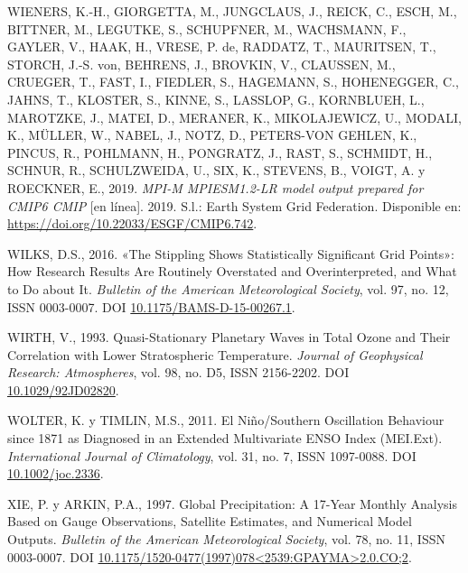 \documentclass[12pt,oneside,a4paper]{reedthesis}
\newlength{\cslhangindent}
\newenvironment{CSLReferences}[2] %
 {%
  \setlength{\parindent}{0pt}
  \ifodd #1 \everypar{\setlength{\hangindent}{\cslhangindent}}\ignorespaces\fi
  \ifnum #2 > 0
  \setlength{\parskip}{#2\baselineskip}
  \fi
 }%
 {}
\begin{document}
\begin{CSLReferences}{1}{0}
\leavevmode{}%
WIENERS, K.-H., GIORGETTA, M., JUNGCLAUS, J., REICK, C., ESCH, M., BITTNER, M., LEGUTKE, S., SCHUPFNER, M., WACHSMANN, F., GAYLER, V., HAAK, H., VRESE, P. de, RADDATZ, T., MAURITSEN, T., STORCH, J.-S. von, BEHRENS, J., BROVKIN, V., CLAUSSEN, M., CRUEGER, T., FAST, I., FIEDLER, S., HAGEMANN, S., HOHENEGGER, C., JAHNS, T., KLOSTER, S., KINNE, S., LASSLOP, G., KORNBLUEH, L., MAROTZKE, J., MATEI, D., MERANER, K., MIKOLAJEWICZ, U., MODALI, K., MÜLLER, W., NABEL, J., NOTZ, D., PETERS-VON GEHLEN, K., PINCUS, R., POHLMANN, H., PONGRATZ, J., RAST, S., SCHMIDT, H., SCHNUR, R., SCHULZWEIDA, U., SIX, K., STEVENS, B., VOIGT, A. y ROECKNER, E., 2019. \emph{MPI-M MPIESM1.2-LR model output prepared for CMIP6 CMIP} {[}en línea{]}. 2019. S.l.: Earth System Grid Federation. Disponible en: \url{https://doi.org/10.22033/ESGF/CMIP6.742}.

\leavevmode{}%
WILKS, D.S., 2016. {«{The Stippling Shows Statistically Significant Grid Points}»}: {How Research Results} Are {Routinely Overstated} and {Overinterpreted}, and {What} to {Do} about {It}. \emph{Bulletin of the American Meteorological Society}, vol. 97, no. 12, ISSN 0003-0007. DOI \href{https://doi.org/10.1175/BAMS-D-15-00267.1}{10.1175/BAMS-D-15-00267.1}.

\leavevmode{}%
WIRTH, V., 1993. Quasi-Stationary Planetary Waves in Total Ozone and Their Correlation with Lower Stratospheric Temperature. \emph{Journal of Geophysical Research: Atmospheres}, vol. 98, no. D5, ISSN 2156-2202. DOI \href{https://doi.org/10.1029/92JD02820}{10.1029/92JD02820}.

\leavevmode{}%
WOLTER, K. y TIMLIN, M.S., 2011. El {Niño}/{Southern Oscillation} Behaviour since 1871 as Diagnosed in an Extended Multivariate {ENSO} Index ({MEI}.Ext). \emph{International Journal of Climatology}, vol. 31, no. 7, ISSN 1097-0088. DOI \href{https://doi.org/10.1002/joc.2336}{10.1002/joc.2336}.

\leavevmode{}%
XIE, P. y ARKIN, P.A., 1997. Global {Precipitation}: {A} 17-{Year Monthly Analysis Based} on {Gauge Observations}, {Satellite Estimates}, and {Numerical Model Outputs}. \emph{Bulletin of the American Meteorological Society}, vol. 78, no. 11, ISSN 0003-0007. DOI \href{https://doi.org/10.1175/1520-0477(1997)078\%3C2539:GPAYMA\%3E2.0.CO;2}{10.1175/1520-0477(1997)078\textless2539:GPAYMA\textgreater2.0.CO;2}.


\end{CSLReferences}
\end{document}
